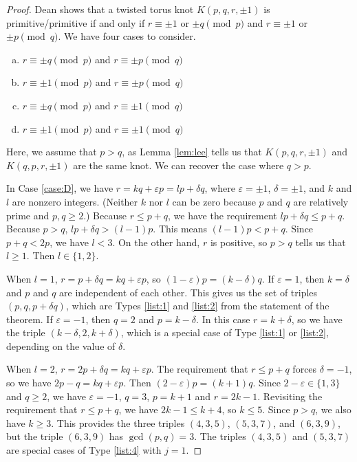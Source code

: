\documentclass{amsart}
\newcommand{\eps}{\varepsilon}
\begin{document}
\begin{proof}
Dean \cite{DeanSFSSurgeries} shows that a twisted torus knot $K(p,q,r, \pm 1)$ is primitive/primitive if and only if $r \equiv \pm 1$ or $\pm q \pmod p $ and $r \equiv \pm 1$ or $\pm p \pmod q$. We have four cases to consider.
\begin{enumerate}[(a)]
\item\label{case:D} $r \equiv \pm q \pmod p$ and $r \equiv \pm p \pmod q$
\item\label{case:A} $r \equiv \pm 1 \pmod p$ and $r \equiv \pm p \pmod q$
\item\label{case:B} $r \equiv \pm q \pmod p$ and $r \equiv \pm 1 \pmod q$
\item\label{case:C} $r \equiv \pm 1 \pmod p$ and $r \equiv \pm 1 \pmod q$
\end{enumerate}

Here, we assume that $p>q$, as Lemma \ref{lem:lee} tells us that $K(p,q,r,\pm 1)$ and $K(q,p,r,\pm1)$ are the same knot. We can recover the case where $q>p$.

In Case \ref{case:D}, we have $r = kq + \eps p = lp + \delta q$, where $\eps = \pm 1$, $\delta = \pm 1$, and $k$ and $l$ are nonzero integers. (Neither $k$ nor $l$ can be zero because $p$ and $q$ are relatively prime and $p,q \ge 2$.) Because $ r \le p + q$, we have the requirement $ lp + \delta q \le p+q$. Because $p>q$, $lp + \delta q > (l-1) p$. This means $(l-1)p < p+q$. Since $p+ q < 2p$, we have $l < 3$. On the other hand, $r$ is positive,  so $p>q$ tells us that $l \ge 1$. Then $l \in \{1, 2\}$.

When $l = 1$, $r = p + \delta q = kq + \eps p$, so $(1-\eps) p = (k - \delta) q$. If $\eps = 1$,  then $k = \delta$ and $p$ and $q$ are independent of each other. This gives us the set of triples $(p, q, p + \delta q)$, which are Types \ref{list:1} and \ref{list:2} from the statement of the theorem. If $\eps = -1$, then $q = 2$ and $p = k - \delta$. In this case $r = k + \delta$, so we have the triple $(k- \delta, 2, k + \delta)$, which is a special case of Type \ref{list:1} or \ref{list:2}, depending on the value of $\delta$.

When $l = 2$, $r = 2 p + \delta q = kq  + \eps p$. The requirement that $r \le p + q$ forces $\delta = -1$, so we have $2p - q = k q + \eps p$. Then $(2- \eps) p = (k+1) q$. Since $2- \eps \in \{1, 3\}$ and $q \ge 2$, we have $\eps = -1$, $q = 3$, $p= k+1$ and $r = 2k - 1$. Revisiting the requirement that $r \le p + q$, we have $2k-1 \le k+4$, so $k \le 5$. Since $p > q$, we also have $k \ge 3$. This provides the three triples $(4,3,5)$, $(5, 3, 7)$, and $(6, 3, 9)$, but the triple $(6,3,9)$ has $\gcd(p,q) = 3$. The triples $(4,3,5)$ and $(5, 3, 7)$ are special cases of Type \ref{list:4} with $j=1$. 


\end{proof}
\end{document}
